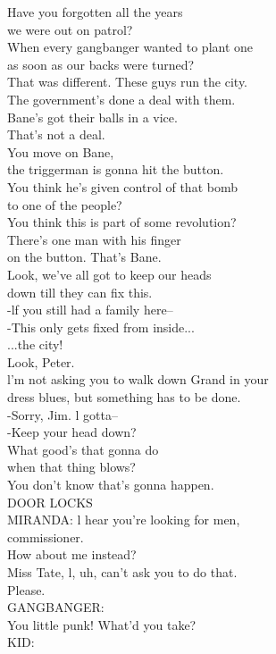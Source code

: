 \documentclass{article}
\begin{document}
\begin{multicols}{3}
Have you forgotten all the years\\
we were out on patrol?\\
When every gangbanger wanted to plant one\\
as soon as our backs were turned?\\
That was different. These guys run the city.\\
The government's done a deal with them.\\
Bane's got their balls in a vice.\\
That's not a deal.\\
You move on Bane,\\
the triggerman is gonna hit the button.\\
You think he's given control of that bomb\\
to one of the people?\\
You think this is part of some revolution?\\
There's one man with his finger\\
on the button. That's Bane.\\
Look, we've all got to keep our heads\\
down till they can fix this.\\
-lf you still had a family here--\\
-This only gets fixed from inside...\\
...the city!\\
Look, Peter.\\
l'm not asking you to walk down Grand in your\\
dress blues, but something has to be done.\\
-Sorry, Jim. l gotta--\\
-Keep your head down?\\
What good's that gonna do\\
when that thing blows?\\
You don't know that's gonna happen.\\
DOOR LOCKS\\
MIRANDA: l hear you're looking for men,\\
commissioner.\\
How about me instead?\\
Miss Tate, l, uh, can't ask you to do that.\\
Please.\\
GANGBANGER:\\
You little punk! What'd you take?\\
KID:\\

\end{multicols}
\end{document}
